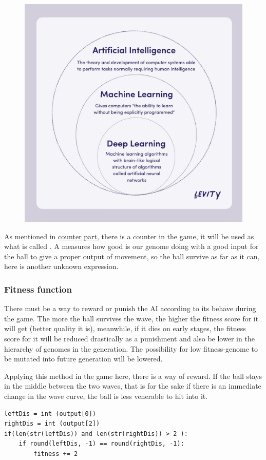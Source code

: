 \begin{figure}[H]
	\centering
	\includegraphics[width=0.7\linewidth]{"usedImages/AI vs Machine Learning vs Deep Learning"}
	\caption{}
	\label{fig:ai-vs-machine-learning-vs-deep-learning}
\end{figure}

As mentioned in \hyperref[display-score]{counter part}, there is a counter in the game, it will be used as what is called . A  measures how good is our genome doing with a good input for the ball to give a proper output of movement, so the ball survive as far as it can, here is another unknown expression.
 
\subsubsection{Fitness function}
There must be a way to reward or punish the AI according to its behave during the game. The more the ball survives the wave, the higher the fitness score for it will get (better quality it is), meanwhile, if it dies on early stages, the fitness score for it will be reduced drastically as a punishment and also be lower in the hierarchy of genomes in the generation. The possibility for low fitness-genome to be mutated into future generation will be lowered.

Applying this method in the game here, there is a way of reward. If the ball stays in the middle between the two waves, that is for the sake if there is an immediate change in the wave curve, the ball is less venerable to hit into it.

\begin{listing}[H]
\begin{verbatim}
leftDis = int (output[0])
rightDis = int (output[2])
if(len(str(leftDis)) and len(str(rightDis)) > 2 ):
	if round(leftDis, -1) == round(rightDis, -1):
		fitness += 2
\end{verbatim}
\end{listing}


